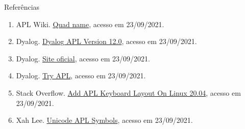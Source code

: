\begin{frame}[fragile]{Referências}

    \begin{enumerate}
        \item APL Wiki. \href{https://aplwiki.com/wiki/Quad_name}{Quad name}, acesso em 23/09/2021.

        \item Dyalog. \href{https://help.dyalog.com/12.0/index.html}{Dyalog APL Version 12.0}, acesso em 23/09/2021.

        \item Dyalog. \href{dialog.com/}{Site oficial}, acesso em 23/09/2021.

        \item Dyalog. \href{https://tryapl.org/}{Try APL}, acesso em 23/09/2021.
 
        \item Stack Overflow. \href{https://stackoverflow.com/questions/68065520/add-apl-keyboard-layout-on-linux-20-04}{Add APL Keyboard Layout On Linux 20.04}, acesso em 23/09/2021.

        \item Xah Lee. \href{http://xahlee.info/comp/unicode_APL_symbols.html}{Unicode APL Symbols}, acesso em 23/09/2021.
    \end{enumerate}

\end{frame}

